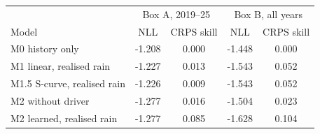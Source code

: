 \begin{tabular}{lcccc}\toprule
 & \multicolumn{2}{c}{Box A, 2019--25} & \multicolumn{2}{c}{Box B, all years}\\
Model & NLL & CRPS skill & NLL & CRPS skill\\\midrule
M0 history only & -1.208 & 0.000 & -1.448 & 0.000\\
M1 linear, realised rain & -1.227 & 0.013 & -1.543 & 0.052\\
M1.5 S-curve, realised rain & -1.226 & 0.009 & -1.543 & 0.052\\
M2 without driver & -1.277 & 0.016 & -1.504 & 0.023\\
M2 learned, realised rain & -1.277 & 0.085 & -1.628 & 0.104\\
\bottomrule\end{tabular}
